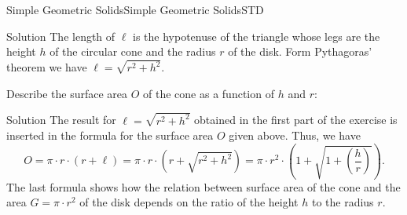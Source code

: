 \begin{MXContent}{Simple Geometric Solids}{Simple Geometric Solids}{STD}
\begin{MExercise}
\begin{MExerciseItems}
\begin{MHint}{Solution}
The length of $\ell$ is the hypotenuse of the triangle whose legs are the height
$h$ of the circular cone and the radius $r$ of the disk. Form Pythagoras' theorem
we have $\ell = \sqrt{r^2 + h^2}$.
\end{MHint}

\item
Describe the surface area $O$ of the cone as a function of $h$ and $r$:
\par

\begin{MHint}{Solution}
The result for $\ell = \sqrt{r^2 + h^2}$ obtained in the first part of the exercise is inserted 
in the formula for the surface area $O$ given above. Thus, we have
\[
O = \pi \cdot r \cdot (r + \ell) %
 = \pi \cdot r \cdot \left(r + \sqrt{r^2 + h^2}\right) %
 = \pi \cdot r^2 \cdot \left(1 + \sqrt{1 + \left(\frac{h}{r}\right)} \right). %
\]
The last formula shows how the relation between surface area of the cone  and the area $G = \pi \cdot r^2$ of the disk depends on the ratio of the height 
$h$ to the radius $r$.
\end{MHint}
\end{MExerciseItems}
\end{MExercise}

\end{MXContent}


